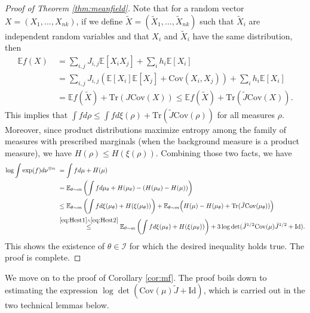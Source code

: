 \documentclass[12pt]{article}
\def \Tr {\mathrm{Tr}}
\def \EE {\mathbb E}
\def \Cov {\mathrm {Cov}}
\def \Id {\mathrm{Id}}
\def \Cov {\mathrm{Cov}}
\theoremstyle{definition}
\theoremstyle{remark}
\begin{document}
\begin{proof}[Proof of Theorem \ref{thm:meanfield}]
	Note that for a random vector $X = (X_1,...,X_{nk})$, if we define $\tilde X = (\tilde X_1, ..., \tilde X_{nk})$ such that $\tilde X_i$ are independent random variables and that $X_i$ and $\tilde X_i$ have the same distribution, then
	\begin{align*}
	\EE f(X) ~& = \sum_{i,j} J_{i,j} \EE[X_i X_j] + \sum_i h_i \EE[X_i] \\
	& = \sum_{i,j} J_{i,j} \left (\EE[X_i] \EE [X_j] + \Cov(X_i, X_j) \right ) + \sum_i h_i \EE[X_i] \\
	& = \EE f(\tilde X) + \Tr(J \Cov(X)) \leq \EE f(\tilde X) + \Tr(\tilde J \Cov(X)).
	\end{align*}
	This implies that $\int f d \rho \leq \int f d \xi(\rho) + \Tr(\tilde J \Cov(\rho))$ for all measures $\rho$. Moreover, since product distributions maximize entropy among the family of measures with prescribed marginals (when the background measure is a product measure), we have $H(\rho) \leq H(\xi(\rho))$. Combining those two facts, we have
	\begin{align*}
	\log \int \exp(f) d \nu^{\otimes n} ~& = \int f d \mu + H(\mu) \\
	& = \EE_{\theta \sim m} \left (\int f d \mu_\theta + H(\mu_\theta) - (H(\mu_\theta) - H(\mu))  \right ) \\
	& \leq \EE_{\theta \sim m} \left (\int f d \xi(\mu_\theta) + H(\xi(\mu_\theta)) \right ) + \EE_{\theta \sim m}  \Bigl  (H(\mu) - H(\mu_\theta) + \Tr(\tilde J \Cov(\mu_\theta)) \Bigr ) \\
	& \stackrel{ \eqref{eq:Hest1} \wedge \eqref{eq:Hest2} }{\leq} \EE_{\theta \sim m} \left (\int f d \xi(\mu_\theta) + H(\xi(\mu_\theta)) \right ) + 3 \log \det ( \tilde J^{1/2} \Cov(\mu) \tilde J^{1/2} + \Id).
	\end{align*}
	This shows the existence of $\theta \in \mathcal{I}$ for which the desired inequality holds true. The proof is complete.
\end{proof}

We move on to the proof of Corollary \ref{cor:mf}. The proof boils down to estimating the expression $\log \det ( \Cov(\mu) \tilde J + \Id)$, which is carried out in the two technical lemmas below.
\end{document}

